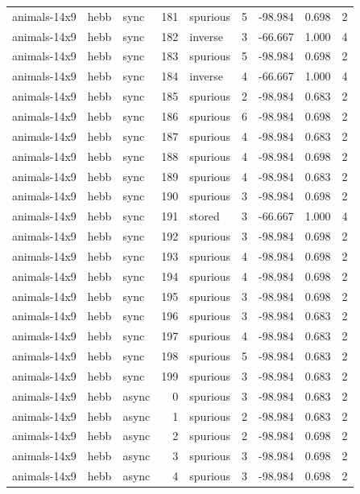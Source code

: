 \begin{tabular}{lllrlrrrr}
animals-14x9 & hebb & sync & 181 & spurious & 5 & -98.984 & 0.698 & 2 \\
animals-14x9 & hebb & sync & 182 & inverse & 3 & -66.667 & 1.000 & 4 \\
animals-14x9 & hebb & sync & 183 & spurious & 5 & -98.984 & 0.698 & 2 \\
animals-14x9 & hebb & sync & 184 & inverse & 4 & -66.667 & 1.000 & 4 \\
animals-14x9 & hebb & sync & 185 & spurious & 2 & -98.984 & 0.683 & 2 \\
animals-14x9 & hebb & sync & 186 & spurious & 6 & -98.984 & 0.698 & 2 \\
animals-14x9 & hebb & sync & 187 & spurious & 4 & -98.984 & 0.683 & 2 \\
animals-14x9 & hebb & sync & 188 & spurious & 4 & -98.984 & 0.698 & 2 \\
animals-14x9 & hebb & sync & 189 & spurious & 4 & -98.984 & 0.683 & 2 \\
animals-14x9 & hebb & sync & 190 & spurious & 3 & -98.984 & 0.698 & 2 \\
animals-14x9 & hebb & sync & 191 & stored & 3 & -66.667 & 1.000 & 4 \\
animals-14x9 & hebb & sync & 192 & spurious & 3 & -98.984 & 0.698 & 2 \\
animals-14x9 & hebb & sync & 193 & spurious & 4 & -98.984 & 0.698 & 2 \\
animals-14x9 & hebb & sync & 194 & spurious & 4 & -98.984 & 0.698 & 2 \\
animals-14x9 & hebb & sync & 195 & spurious & 3 & -98.984 & 0.698 & 2 \\
animals-14x9 & hebb & sync & 196 & spurious & 3 & -98.984 & 0.683 & 2 \\
animals-14x9 & hebb & sync & 197 & spurious & 4 & -98.984 & 0.683 & 2 \\
animals-14x9 & hebb & sync & 198 & spurious & 5 & -98.984 & 0.683 & 2 \\
animals-14x9 & hebb & sync & 199 & spurious & 3 & -98.984 & 0.683 & 2 \\
animals-14x9 & hebb & async & 0 & spurious & 3 & -98.984 & 0.683 & 2 \\
animals-14x9 & hebb & async & 1 & spurious & 2 & -98.984 & 0.683 & 2 \\
animals-14x9 & hebb & async & 2 & spurious & 2 & -98.984 & 0.698 & 2 \\
animals-14x9 & hebb & async & 3 & spurious & 3 & -98.984 & 0.698 & 2 \\
animals-14x9 & hebb & async & 4 & spurious & 3 & -98.984 & 0.698 & 2 \\

\end{tabular}
